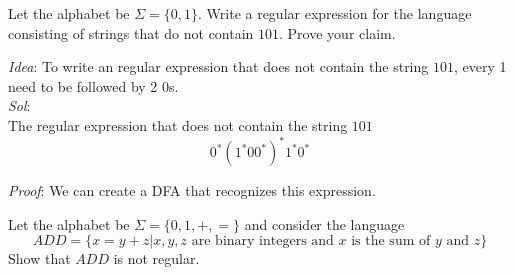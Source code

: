 

\question
Let the alphabet be $\Sigma = \{0,1\}$. Write a regular expression for the language consisting of strings that do not contain $101$. Prove your claim.


\begin{solution}

  \emph{Idea}: To write an regular expression that does not contain the string $101$, every 1 need to be followed by 2 $0$s.\\
  \emph{Sol}:\\
  The regular expression that does not contain the string $101$
  \[0^{*}(1^{*}00^{*})^{*}1^{*}0^{*}\]

  \emph{Proof}:
  We can create a DFA that recognizes this expression.


\end{solution}

\question %
Let the alphabet be $\Sigma = \{0,1,+, =\}$ and consider the language
\[ADD = \{x = y+z | x,y,z \text{ are binary integers and } x \text{ is the sum of } y \text{ and } z\}\]
Show that $ADD$ is not regular.

